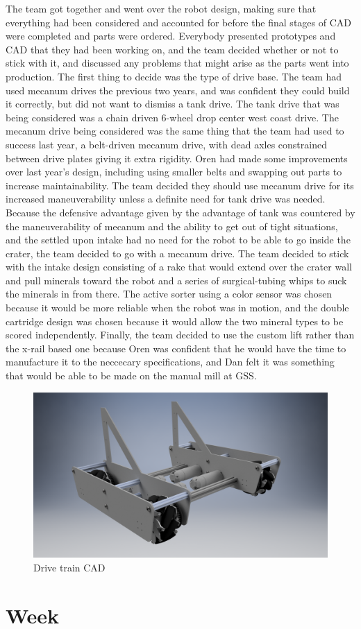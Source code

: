 \documentclass{article}
\begin{document}
The team got together and went over the robot design, making sure that everything had been considered and accounted for before the final stages of CAD were completed and parts were ordered. Everybody presented prototypes and CAD that they had been working on, and the team decided whether or not to stick with it, and discussed any problems that might arise as the parts went into production. The first thing to decide was the type of drive base. The team had used mecanum drives the previous two years, and was confident they could build it correctly, but did not want to dismiss a tank drive. The tank drive that was being considered was a chain driven 6-wheel drop center west coast drive. The mecanum drive being considered was the same thing that the team had used to success last year, a belt-driven mecanum drive, with dead axles constrained between drive plates giving it extra rigidity. Oren had made some improvements over last year's design, including using smaller belts and swapping out parts to increase maintainability. The team decided they should use mecanum drive for its increased maneuverability unless a definite need for tank drive was needed. Because the defensive advantage given by the advantage of tank was countered by the maneuverability of mecanum and the ability to get out of tight situations, and the settled upon intake had no need for the robot to be able to go inside the crater, the team decided to go with a mecanum drive. The team decided to stick with the intake design consisting of a rake that would extend over the crater wall and pull minerals toward the robot and a series of surgical-tubing whips to suck the minerals in from there. The active sorter using a color sensor was chosen because it would be more reliable when the robot was in motion, and the double cartridge design was chosen because it would allow the two mineral types to be scored independently. Finally, the team decided to use the custom lift rather than the x-rail based one because Oren was confident that he would have the time to manufacture it to the neccecary specifications, and Dan felt it was something that would be able to be made on the manual mill at GSS.

\begin{figure}
    \centering
    \includegraphics[width=.6 \textwidth, ]{06_10-08/images/robot[1].png}
    \caption{Drive train CAD}
    \label{Dive train CAD}
\end{figure}\clearpage \newpage \section{Week \thesection} 
\end{document}
